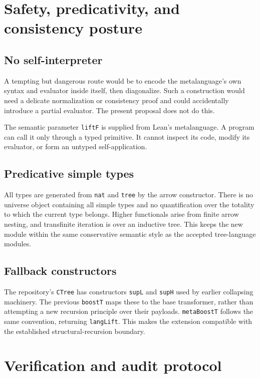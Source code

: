 \documentclass[11pt]{article}
\theoremstyle{definition}
\newcommand{\code}[1]{\texttt{#1}}
\begin{document}
\section{Safety, predicativity, and consistency posture}

\subsection{No self-interpreter}

A tempting but dangerous route would be to encode the metalanguage's own syntax
and evaluator inside itself, then diagonalize.  Such a construction would need
a delicate normalization or consistency proof and could accidentally introduce
a partial evaluator.  The present proposal does not do this.

The semantic parameter \code{liftF} is supplied from Lean's metalanguage.  A
program can call it only through a typed primitive.  It cannot inspect its code,
modify its evaluator, or form an untyped self-application.

\subsection{Predicative simple types}

All types are generated from \code{nat} and \code{tree} by the arrow
constructor.  There is no universe object containing all simple types and no
quantification over the totality to which the current type belongs.  Higher
functionals arise from finite arrow nesting, and transfinite iteration is over
an inductive tree.  This keeps the new module within the same conservative
semantic style as the accepted tree-language modules.

\subsection{Fallback constructors}

The repository's \code{CTree} has constructors \code{supL} and \code{supH}
used by earlier collapsing machinery.  The previous \code{boostT} maps these to
the base transformer, rather than attempting a new recursion principle over
their payloads.  \code{metaBoostT} follows the same convention, returning
\code{langLift}.  This makes the extension compatible with the established
structural-recursion boundary.

\section{Verification and audit protocol}
\end{document}
